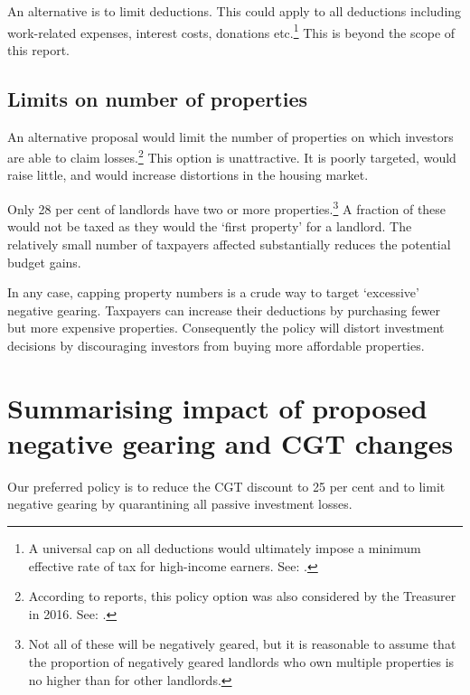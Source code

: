An alternative is to limit deductions. This could apply to all deductions including work-related expenses, interest costs, donations etc.\footnote{A universal cap on all deductions would ultimately impose a minimum effective rate of tax for high-income earners. See: \textcite[][61]{BCA2016}.}  This is beyond the scope of this report. 

\subsection{Limits on number of properties}
An alternative proposal would limit the number of properties on which investors are able to claim losses.\footnote{According to reports, this policy option was also considered by the Treasurer in 2016. See: \textcite{Coorey2016}.}  This option is unattractive. It is poorly targeted, would raise little, and would increase distortions in the housing market.

Only 28 per cent of landlords have two or more properties.\footnote{\textcites{ABS2015-Survey-of-income-and-housing-2013-14}{HILDA2015} Not all of these will be negatively geared, but it is reasonable to assume that the proportion of negatively geared landlords who own multiple properties is no higher than for other landlords.} A fraction of these would not be taxed as they would the ‘first property’ for a landlord. The relatively small number of taxpayers affected substantially reduces the potential budget gains. 

In any case, capping property numbers is a crude way to target ‘excessive’ negative gearing. Taxpayers can increase their deductions by purchasing fewer but more expensive properties. Consequently the policy will distort investment decisions by discouraging investors from buying more affordable properties. 

\section{Summarising impact of proposed negative gearing and CGT changes}\label{sec:Summarizing-impact-proposed-NG-and-CGT}
Our preferred policy is to reduce the CGT discount to 25 per cent and to limit negative gearing by quarantining all passive investment losses.


